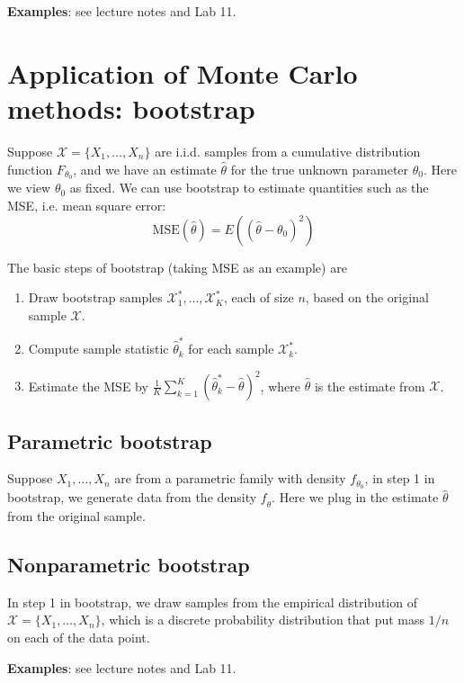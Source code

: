 \documentclass[12pt]{article}
\begin{document}
\vspace{0.5cm}
\textbf{Examples}: see lecture notes and Lab 11.

\section{Application of Monte Carlo methods: bootstrap}
Suppose $\mathcal{X}=\{X_1,\ldots,X_n\}$ are i.i.d. samples from a cumulative distribution function $F_{\theta_0}$, and we have an estimate $\hat{\theta}$ for the true unknown parameter $\theta_0$. Here we view $\theta_0$ as fixed. We can use bootstrap to estimate quantities such as the MSE, i.e. mean square error:
$$\text{MSE}(\hat{\theta})=E((\hat{\theta}-\theta_0)^2)$$

The basic steps of bootstrap (taking MSE as an example) are
\begin{enumerate}
\item Draw bootstrap samples $\mathcal{X}_1^* , ... , \mathcal{X}_K^*$, each of size $n$, based on the original sample $\mathcal{X}$.
\item Compute sample statistic $\hat\theta_k^*$ for each sample $\mathcal{X}_k^*$.
\item Estimate the MSE by $\frac{1}{K}\sum_{k=1}^K (\hat\theta_k^* - \hat\theta)^2$, where $\hat\theta$ is the estimate from $\mathcal{X}$.
\end{enumerate}

\subsection*{Parametric bootstrap}
Suppose $X_1,\ldots,X_n$ are from a parametric family with density $f_{\theta_0}$, in step 1 in bootstrap, we generate data from the density $f_{\hat{\theta}}$. Here we plug in the estimate $\hat{\theta}$ from the original sample.

\subsection*{Nonparametric bootstrap}
In step 1 in bootstrap, we draw samples from the empirical distribution of $\mathcal{X}=\{X_1,\ldots,X_n\}$, which is a discrete probability distribution that put mass $1/n$ on each of the data point.

\vspace{0.5cm}
\textbf{Examples}: see lecture notes and Lab 11.
\end{document}
